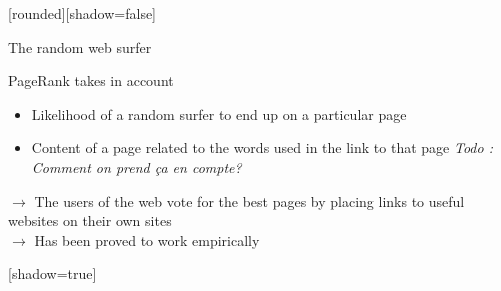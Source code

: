 \documentclass[10pt]{beamer}
\begin{document}
[rounded][shadow=false]
\begin{frame}{The random web surfer}
  \begin{block}{PageRank takes in account}
    \begin{itemize}
      \item Likelihood of a random surfer to end up on a particular page
      \item Content of a page related to the words used in the link to that page \textit{Todo : Comment on prend ça en compte?}
    \end{itemize}
    $\rightarrow$ The users of the web vote for the best pages by placing links to useful websites on their own sites\\
    $\rightarrow$ Has been proved to work empirically
  \end{block}
\end{frame}

[shadow=true]
\end{document}
